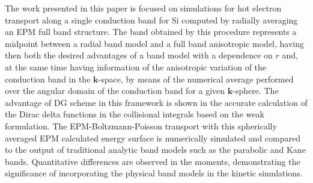\documentclass[11pt]{article}
\newcommand{\bk}{\mathbf{k}}
\begin{document}
The work presented in this paper is focused on simulations for hot electron transport along a single 
conduction band for Si computed by radially averaging an EPM full band structure. The band obtained by this procedure represents a midpoint 
between a radial band model and a full band anisotropic model, having then both the desired advantages 
of a band model with a dependence on $r$ and, at the same time having information of the 
anisotropic variation of the conduction band in the
$\bk$-space, by means of the numerical average 
performed over the angular domain of the conduction band for a given 
$\bk$-sphere. The advantage of DG scheme in this framework is shown in the accurate calculation of the Dirac delta functions in the collisional integrals based on the weak formulation. The EPM-Boltzmann-Poisson transport with this spherically averaged EPM 
calculated energy surface is 
numerically simulated and compared to the output of traditional analytic 
band models such as the 
parabolic and Kane bands. Quantitative differences are
observed in the  moments, demonstrating the significance of incorporating the physical band models in the kinetic simulations.






%




\end{document}

